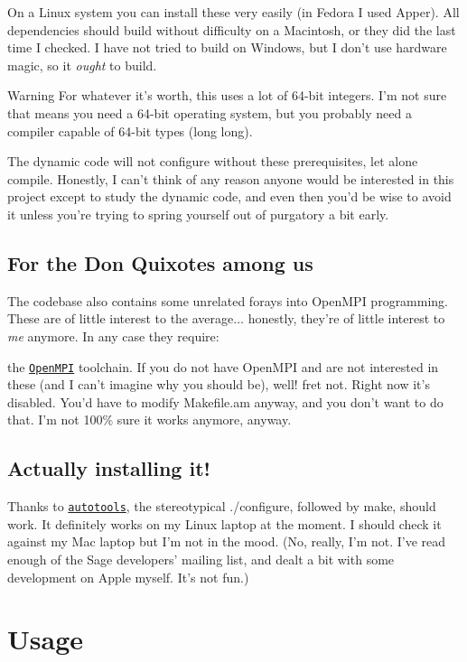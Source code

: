 On a Linux system you can install these very easily (in Fedora I used {\ttfamily Apper}). All dependencies should build without difficulty on a Macintosh, or they did the last time I checked. I have not tried to build on Windows, but I don't use hardware magic, so it {\itshape ought} to build.

\begin{DoxyWarning}{Warning}
For whatever it's worth, this uses a lot of 64-\/bit integers. I'm not sure that means you need a 64-\/bit operating system, but you probably need a compiler capable of 64-\/bit types ({\ttfamily long long}).

The dynamic code will not configure without these prerequisites, let alone compile. Honestly, I can't think of any reason anyone would be interested in this project except to study the dynamic code, and even then you'd be wise to avoid it unless you're trying to spring yourself out of purgatory a bit early.
\end{DoxyWarning}
\hypertarget{index_OpenMPI}{}\subsection{For the Don Quixotes among us}\label{index_OpenMPI}
The codebase also contains some unrelated forays into Open\+M\+PI programming. These are of little interest to the average{$\dots$} honestly, they're of little interest to {\itshape me} anymore. In any case they require\+:
\begin{DoxyItemize}
\item the \href{https://www.open-mpi.org/}{\tt Open\+M\+PI} toolchain. If you do not have Open\+M\+PI and are not interested in these (and I can't imagine why you should be), well! fret not. Right now it's disabled. You'd have to modify {\ttfamily Makefile.\+am} anyway, and you don't want to do that. I'm not 100\% sure it works anymore, anyway.
\end{DoxyItemize}\hypertarget{index_Installation}{}\subsection{Actually installing it!}\label{index_Installation}
Thanks to \href{https://www.gnu.org/software/automake/}{\tt {\ttfamily autotools}}, the stereotypical {\ttfamily ./configure}, followed by {\ttfamily make}, should work. It definitely works on my Linux laptop at the moment. I should check it against my Mac laptop but I'm not in the mood. (No, really, I'm not. I've read enough of the Sage developers' mailing list, and dealt a bit with some development on Apple myself. It's not fun.)\hypertarget{index_Usage}{}\section{Usage}\label{index_Usage}
